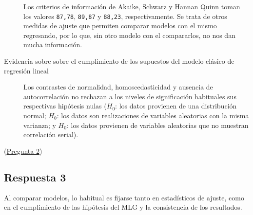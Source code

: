 \documentclass[10pt]{article}
\begin{document}
\begin{description}
Los criterios de información de Akaike, Schwarz y Hannan Quinn toman los valores \texttt{87,78}, \texttt{89,87} y \texttt{88,23}, respectivamente. Se trata de otros medidas de ajuste que permiten comparar modelos con el mismo regresando, por lo que, sin otro modelo con el compararlos, no nos dan mucha información.

\item[{Evidencia sobre sobre el cumplimiento de los supuestos del modelo clásico de regresión lineal}] Los contrastes de normalidad, homoscedasticidad y ausencia de autocorrelación no rechazan a los niveles de significación habituales sus respectivas hipótesis nulas (\(H_0\): los datos provienen de una distribución normal; \(H_0\): los datos son realizaciones de variables aleatorias con la misma varianza; y \(H_0\): los datos provienen de variables aleatorias que no muestran correlación serial).
\end{description}

(\hyperref[sec:org2a5c222]{Pregunta 2})
\subsection*{Respuesta 3}
\label{sec:orgbbeaf09}

Al comparar modelos, lo habitual es fijarse tanto en estadísticos de ajuste, como en el cumplimiento de las hipótesis del MLG y la consistencia de los resultados.
\end{document}
